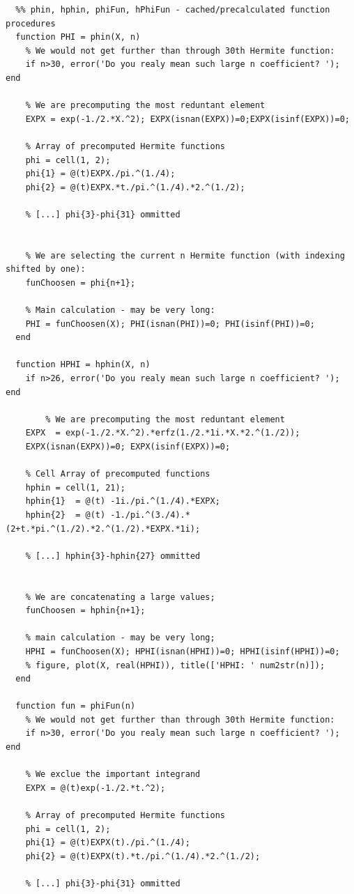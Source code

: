\documentclass[12pt,twoside,a4paper]{article}
\numberwithin{equation}{subsection}
\numberwithin{figure}{subsection}
\begin{document}
\begin{lstlisting}
  %% phin, hphin, phiFun, hPhiFun - cached/precalculated function procedures
  function PHI = phin(X, n)
    % We would not get further than through 30th Hermite function:
    if n>30, error('Do you realy mean such large n coefficient? '); end

    % We are precomputing the most reduntant element
    EXPX = exp(-1./2.*X.^2); EXPX(isnan(EXPX))=0;EXPX(isinf(EXPX))=0;

    % Array of precomputed Hermite functions
    phi = cell(1, 2);
    phi{1} = @(t)EXPX./pi.^(1./4);
    phi{2} = @(t)EXPX.*t./pi.^(1./4).*2.^(1./2);

    % [...] phi{3}-phi{31} ommitted 


    % We are selecting the current n Hermite function (with indexing shifted by one):
    funChoosen = phi{n+1};

    % Main calculation - may be very long:
    PHI = funChoosen(X); PHI(isnan(PHI))=0; PHI(isinf(PHI))=0;
  end
		
  function HPHI = hphin(X, n)
    if n>26, error('Do you realy mean such large n coefficient? '); end

    	% We are precomputing the most reduntant element
    EXPX  = exp(-1./2.*X.^2).*erfz(1./2.*1i.*X.*2.^(1./2)); 
    EXPX(isnan(EXPX))=0; EXPX(isinf(EXPX))=0;

    % Cell Array of precomputed functions
    hphin = cell(1, 21);
    hphin{1}  = @(t) -1i./pi.^(1./4).*EXPX;
    hphin{2}  = @(t) -1./pi.^(3./4).*(2+t.*pi.^(1./2).*2.^(1./2).*EXPX.*1i);

    % [...] hphin{3}-hphin{27} ommitted 

     
    % We are concatenating a large values;
    funChoosen = hphin{n+1};

    % main calculation - may be very long;
    HPHI = funChoosen(X); HPHI(isnan(HPHI))=0; HPHI(isinf(HPHI))=0;
    % figure, plot(X, real(HPHI)), title(['HPHI: ' num2str(n)]);
  end
	
  function fun = phiFun(n)
    % We would not get further than through 30th Hermite function:
    if n>30, error('Do you realy mean such large n coefficient? '); end

    % We exclue the important integrand
    EXPX = @(t)exp(-1./2.*t.^2);

    % Array of precomputed Hermite functions
    phi = cell(1, 2);
    phi{1} = @(t)EXPX(t)./pi.^(1./4);
    phi{2} = @(t)EXPX(t).*t./pi.^(1./4).*2.^(1./2);

    % [...] phi{3}-phi{31} ommitted


\end{lstlisting}
\end{document}
